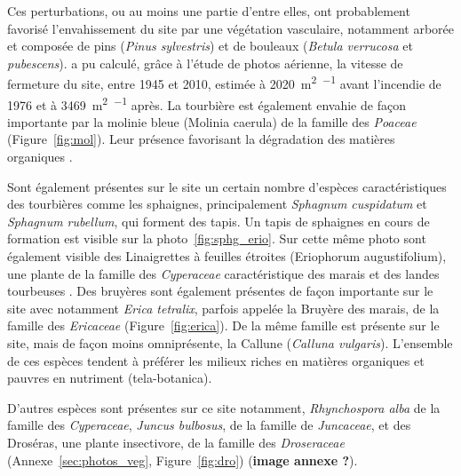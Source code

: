 Ces perturbations, ou au moins une partie d'entre elles, ont probablement favorisé l'envahissement du site par une végétation vasculaire, notamment arborée et composée de pins (\textit{Pinus sylvestris}) et de bouleaux (\textit{Betula verrucosa} et \textit{pubescens}).
\citet{viel2015} a pu calculé, grâce à l'étude de photos aérienne, la vitesse de fermeture du site, entre 1945 et 2010, estimée à \SI{2020}{\square\metre\per\year} avant l'incendie de 1976 et à \SI{3469}{\square\metre\per\year} après.
La tourbière est également envahie de façon importante par la molinie bleue (Molinia caerula) de la famille des \textit{Poaceae} (Figure~\ref{fig:mol}).
Leur présence favorisant la dégradation des matières organiques \citep{gogo2011}.

Sont également présentes sur le site un certain nombre d'espèces caractéristiques des tourbières comme les sphaignes, principalement \textit{Sphagnum cuspidatum} et \textit{Sphagnum rubellum}, qui forment des tapis.
Un tapis de sphaignes en cours de formation est visible sur la photo~\ref{fig:sphg_erio}.
Sur cette même photo sont également visible des Linaigrettes à feuilles étroites (Eriophorum augustifolium), une plante de la famille des \textit{Cyperaceae} caractéristique des marais et des landes tourbeuses \plop.
Des bruyères sont également présentes de façon importante sur le site avec notamment \textit{Erica tetralix}, parfois appelée la Bruyère des marais, de la famille des \textit{Ericaceae} (Figure~\ref{fig:erica}).
De la même famille est présente sur le site, mais de façon moins omniprésente, la Callune (\textit{Calluna vulgaris}).
L'ensemble de ces espèces tendent à préférer les milieux riches en matières organiques et pauvres en nutriment (tela-botanica).

D'autres espèces sont présentes sur ce site notamment, \textit{Rhynchospora alba} de la famille des \textit{Cyperaceae}, \textit{Juncus bulbosus}, de la famille de \textit{Juncaceae}, et des Droséras, une plante insectivore, de la famille des \textit{Droseraceae} (Annexe~\ref{sec:photos_veg}, Figure~\ref{fig:dro}) (\textbf{image annexe ?}). 

